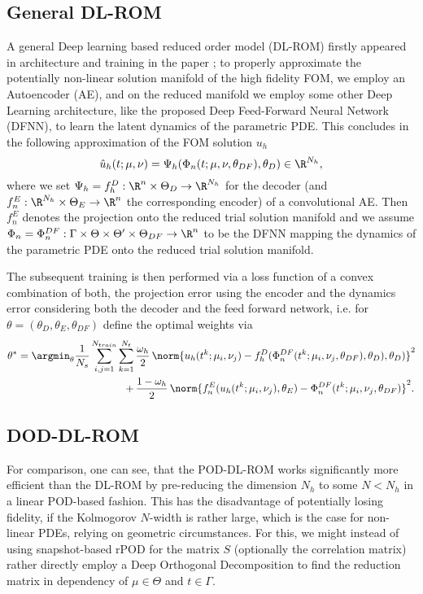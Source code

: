 \subsection{General DL-ROM}

A general Deep learning based reduced order model (DL-ROM) firstly appeared in architecture and training in the paper \cite{DL-ROM}; to properly approximate the potentially non-linear solution manifold of the high fidelity FOM, we employ an Autoencoder (AE), and on the reduced manifold we employ some other Deep Learning architecture, like the proposed Deep Feed-Forward Neural Network (DFNN), to learn the latent dynamics of the parametric PDE. This concludes in the following approximation of the FOM solution $u_h$
\begin{equation}
    \hat{u}_h(t; \mu, \nu) = \Psi_h(\Phi_n(t; \mu, \nu, \theta_{DF}), \theta_{D}) \in \R^{N_h},
\end{equation}
where we set $\Psi_h = f^D_h : \R^n \times \Theta_D \to \R^{N_h}$ for the decoder (and $f^E_n: \R^{N_h} \times \Theta_E \to \R^n$ the corresponding encoder) of a convolutional AE. Then $f^E_n$ denotes the projection onto the reduced trial solution manifold and we assume $\Phi_n = \Phi_n^{DF} : \Gamma \times \Theta \times \Theta' \times \Theta_{DF} \to \R^n$ to be the DFNN mapping the dynamics of the parametric PDE onto the reduced trial solution manifold.

The subsequent training is then performed via a loss function of a convex combination of both, the projection error using the encoder and the dynamics error considering both the decoder and the feed forward network, i.e. for $\theta = (\theta_D, \theta_E, \theta_{DF})$ define the optimal weights via
\begin{align}
    \theta^* = \argmin_\theta \frac{1}{N_s} \sum_{i, j = 1}^{N_{train}} \sum_{k = 1}^{N_t} \, &\frac{\omega_h}{2} \, \norm{u_h(t^k; \mu_i, \nu_j) - f^D_h(\Phi_n^{DF}(t^k; \mu_i, \nu_j, \theta_{DF}), \theta_D), \theta_{D})}^2 \\
    + \, &\frac{1 - \omega_h}{2} \, \norm{f^E_n(u_h(t^k; \mu_i, \nu_j), \theta_E) - \Phi_n^{DF}(t^k; \mu_i, \nu_j, \theta_{DF})}^2.
\end{align}

\subsection{DOD-DL-ROM}

For comparison, one can see, that the POD-DL-ROM works significantly more efficient than the DL-ROM by pre-reducing the dimension $N_h$ to some $N < N_h$ in a linear POD-based fashion. This has the disadvantage of potentially losing fidelity, if the Kolmogorov $N$-width is rather large, which is the case for non-linear PDEs, relying on geometric circumstances. For this, we might instead of using snapshot-based rPOD for the matrix $S$ (optionally the correlation matrix) rather directly employ a Deep Orthogonal Decomposition to find the reduction matrix in dependency of $\mu \in \Theta$ and $t \in \Gamma$.

